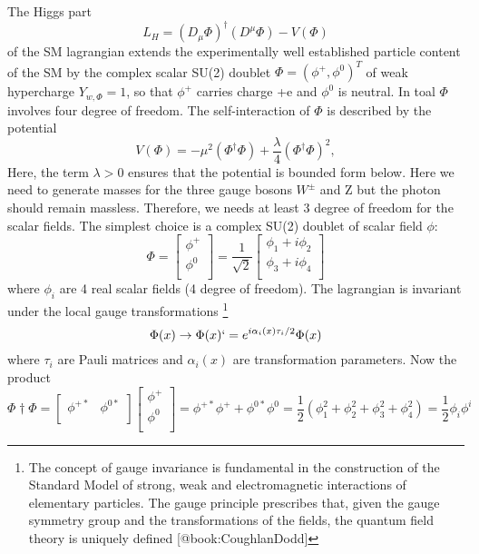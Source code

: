 The Higgs part
\begin{equation}
    L_H=(D_{\mu}\Phi)^{\dagger}(D^{\mu}\Phi)-V(\Phi)
\end{equation}
of the SM lagrangian extends the experimentally well established particle content of the SM by the complex scalar SU(2) doublet $\Phi = (\phi^{+},\phi^0)^T$ of weak hypercharge $Y_{w,\Phi}=1$, so that $\phi^{+}$ carries charge +e and $\phi^0$ is neutral. In toal $\Phi$ involves four degree of freedom. The self-interaction of $\Phi$ is described by the potential
\begin{equation}
    V(\Phi)=-\mu^2(\Phi^{\dagger}\Phi)+\frac{\lambda}{4}(\Phi^{\dagger}\Phi)^2,
\end{equation}
Here, the term $\lambda > 0$ ensures that the potential is bounded form below. Here we need to generate masses for the three gauge bosons $W^{\pm}$ and Z but the photon should remain massless. Therefore, we needs at least 3 degree of freedom for the scalar fields. The simplest choice is a complex SU(2) doublet of scalar field $\phi$:
\begin{equation}\label{mat2}
    \Phi=
        \begin{bmatrix}
        \phi^+  \\
        \phi^0  \\
        \end{bmatrix}
    =\frac{1}{\sqrt{2}}
        \begin{bmatrix}
        \phi_1 + i\phi_2    \\
        \phi_3 + i\phi_4    \\
        \end{bmatrix}
\end{equation}
where $\phi_i$ are 4 real scalar fields (4 degree of freedom). The lagrangian is invariant under the local gauge transformations \footnote{The concept of gauge invariance is fundamental in the construction of the Standard Model of strong, weak and electromagnetic interactions of elementary particles. The gauge principle prescribes that, given the gauge symmetry group and the transformations of the fields, the quantum field theory is uniquely defined [@book:CoughlanDodd]}
\begin{equation}
    \Phi (x) \rightarrow \Phi(x)`=e^{i\alpha_i(x)\tau_i /2}\Phi(x)
\end{equation}
where $\tau_i$ are Pauli matrices and $\alpha_i(x)$ are transformation parameters.
Now the product
\begin{equation}\label{eq:mat1}
    \Phi{\dagger}\Phi=
        \begin{bmatrix}
        \phi^{+*}   &   \phi^{0*} \\
        \end{bmatrix}
        \begin{bmatrix}
        \phi^+  \\
        \phi^0  \\
        \end{bmatrix}
    =\phi^{+*} \phi^+ + \phi^{0*}\phi^0
    =\frac{1}{2}(\phi^2_1+\phi^2_2+\phi^2_3+\phi^2_4)
    =\frac{1}{2}\phi_i \phi^i
\end{equation}
    
